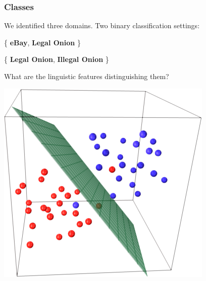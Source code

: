 \documentclass[t,xcolor={svgnames,table}]{beamer}
\begin{document}
\begin{frame}
	\frametitle{Classes}
	We identified three domains. Two binary classification settings:
	\begin{center}
	\{ \textbf{\color{yellow} eBay}, \textbf{\color{green} Legal Onion} \}
	\vfill
	
	\{ \textbf{\color{green} Legal Onion}, \textbf{\color{red} Illegal Onion} \}
	\end{center}
	\vfill
	\pause
	
	What are the linguistic features distinguishing them?
	\vfill
	
	\begin{center}
	\includegraphics[width=.3\textwidth]{svm.png}
	\end{center}
\end{frame}
\end{document}
